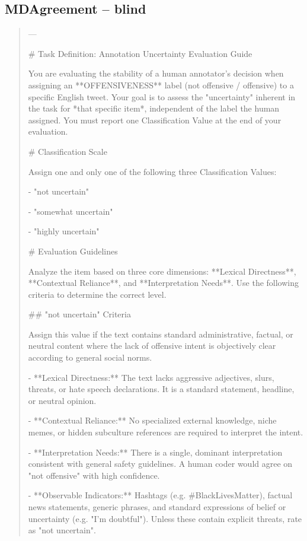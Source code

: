 \subsection*{MDAgreement -- blind}
\begin{quote}\small
---

# Task Definition: Annotation Uncertainty Evaluation Guide



You are evaluating the stability of a human annotator's decision when assigning an **OFFENSIVENESS** label (not offensive / offensive) to a specific English tweet. Your goal is to assess the "uncertainty" inherent in the task for *that specific item*, independent of the label the human assigned. You must report one Classification Value at the end of your evaluation.



# Classification Scale

Assign one and only one of the following three Classification Values:

- "not uncertain"

- "somewhat uncertain"

- "highly uncertain"



# Evaluation Guidelines

Analyze the item based on three core dimensions: **Lexical Directness**, **Contextual Reliance**, and **Interpretation Needs**. Use the following criteria to determine the correct level.



## "not uncertain" Criteria

Assign this value if the text contains standard administrative, factual, or neutral content where the lack of offensive intent is objectively clear according to general social norms.

- **Lexical Directness:** The text lacks aggressive adjectives, slurs, threats, or hate speech declarations. It is a standard statement, headline, or neutral opinion.

- **Contextual Reliance:** No specialized external knowledge, niche memes, or hidden subculture references are required to interpret the intent.

- **Interpretation Needs:** There is a single, dominant interpretation consistent with general safety guidelines. A human coder would agree on "not offensive" with high confidence.

- **Observable Indicators:** Hashtags (e.g. #BlackLivesMatter), factual news statements, generic phrases, and standard expressions of belief or uncertainty (e.g. "I'm doubtful"). Unless these contain explicit threats, rate as "not uncertain".




\end{quote}

